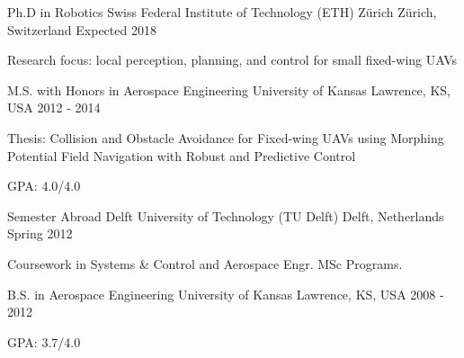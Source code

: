 

\begin{cventries}

  \cventry
    {Ph.D in Robotics} %
    {Swiss Federal Institute of Technology (ETH) Z\"{u}rich} %
    {Z\"{u}rich, Switzerland} %
    {Expected 2018} %
    {
      \begin{cvitems} %
        \item {Research focus: local perception, planning, and control for small fixed-wing UAVs}
      \end{cvitems}
    }
    
  \cventry
    {M.S. with Honors in Aerospace Engineering} %
    {University of Kansas} %
    {Lawrence, KS, USA} %
    {2012 - 2014} %
    {
      \begin{cvitems} %
		\item {Thesis: Collision and Obstacle Avoidance for Fixed-wing UAVs using Morphing Potential Field Navigation with Robust and Predictive Control}
        \item {GPA: 4.0/4.0}
      \end{cvitems}
    }
    
  \cventry
    {Semester Abroad} %
    {Delft University of Technology (TU Delft)} %
    {Delft, Netherlands} %
    {Spring 2012} %
    {
      \begin{cvitems} %
        \item {Coursework in Systems \& Control and Aerospace Engr. MSc Programs.}
      \end{cvitems}
    }
    
  \cventry
    {B.S. in Aerospace Engineering} %
    {University of Kansas} %
    {Lawrence, KS, USA} %
    {2008 - 2012} %
    {
      \begin{cvitems} %
        \item {GPA: 3.7/4.0}
      \end{cvitems}
    }
\end{cventries}
